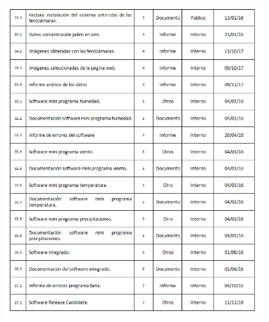 \documentclass[12pt,oneside,a4paper]{article}
\numberwithin{figure}{section}
\begin{document}
\begin{figure}[H]
\begin{center}
\includegraphics[scale=0.8]{Entregablesp2.png}
\end{center}
\end{figure}
\end{document}
